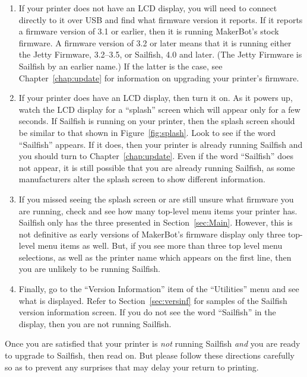 \begin{enumerate}
\item If your printer does not have an LCD display, you will need to connect
  directly to it over USB and find what firmware version it reports.
  If it reports a firmware version of 3.1 or earlier, then it is running MakerBot's 
  stock firmware.  A firmware version of 3.2 or later means that it is running 
  either the Jetty Firmware, 3.2--3.5, or Sailfish, 4.0 and later.  (The Jetty Firmware is Sailfish
  by an earlier name.)  If the latter is the case, see Chapter~\ref{chap:update} for information
  on upgrading your printer's firmware.
\item If your printer does have an LCD display, then turn it on.  As it powers
  up, watch the LCD display for a ``splash'' screen which will appear only
  for a few seconds.  If Sailfish is running on your printer, then the splash
  screen should be similar to that shown in Figure~\ref{fig:splash}.  Look
  to see if the word ``Sailfish'' appears.  If it does, then your printer is
  already running Sailfish and you should turn to Chapter~\ref{chap:update}.
  Even if the word ``Sailfish'' does not appear, it is still possible that you
  are already running Sailfish, as some manufacturers alter the splash screen to
  show different information.
\item If you missed seeing the splash screen or are still unsure what firmware 
  you are running, check and see how many top-level menu items your printer 
  has.  Sailfish only has the three presented in Section~\ref{sec:Main}. 
  However, this is not definitive as early versions 
  of MakerBot's firmware display only three top-level menu items as well.  
  But, if you see more than three top level menu selections, as well as the printer 
  name which appears on the first line, then you are unlikely to be running Sailfish.
\item Finally, go to the ``Version Information'' item of the
  ``Utilities'' menu and see what is displayed.  Refer to
  Section~\ref{sec:versinf} for samples of the Sailfish version
  information screen.  If you do not see the word ``Sailfish'' in the
  display, then you are not running Sailfish.
\end{enumerate}

Once you are satisfied that your printer is \emph{not} running Sailfish
\emph{and} you are ready to upgrade to Sailfish, then read on.  But please
follow these directions carefully so as to prevent any surprises that may delay
your return to printing.

